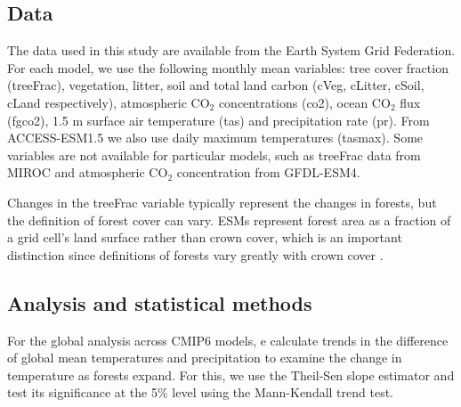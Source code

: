 \documentclass[draft]{agujournal2019}
\begin{document}
\subsection{Data}

The data used in this study are available from the Earth System Grid Federation.
For each model, we use the following monthly mean variables: tree cover fraction (treeFrac), vegetation, litter, soil and total land carbon (cVeg, cLitter, cSoil, cLand respectively), atmospheric CO$_2$ concentrations (co2), ocean CO$_2$ flux (fgco2), 1.5 m surface air temperature (tas) and precipitation rate (pr).
From ACCESS-ESM1.5 we also use daily maximum temperatures (tasmax).
Some variables are not available for particular models, such as treeFrac data from MIROC and atmospheric CO$_2$ concentration from GFDL-ESM4.

Changes in the treeFrac variable typically represent the changes in forests, but the definition of forest cover can vary.
ESMs represent forest area as a fraction of a grid cell's land surface rather than crown cover, which is an important distinction since definitions of forests vary greatly with crown cover \cite{zomer_land_2008}.

\subsection{Analysis and statistical methods}

For the global  analysis across CMIP6 models,  e calculate trends in the difference of global mean temperatures and precipitation to examine the change in temperature as forests expand.
For this, we use the Theil-Sen slope estimator and test its significance at the 5\% level using the Mann-Kendall trend test.
\end{document}
